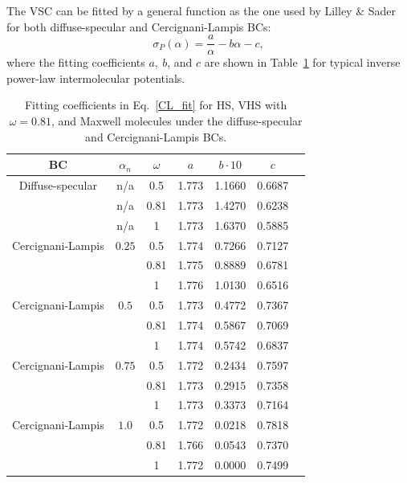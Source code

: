 The VSC can be fitted by a general function as the one used by Lilley \& Sader~\cite{lilley2008velocity} for both diffuse-specular and Cercignani-Lampis BCs:
\begin{equation}\label{CL_fit}
\sigma_P(\alpha)=\frac{a}{\alpha}-b\alpha-c,
\end{equation}
where the fitting coefficients $a,~b$, and $c$ are shown in
Table~\ref{table:slipcoe_fit} for typical inverse power-law intermolecular potentials.



\begin{table}[t]
	\caption{Fitting coefficients in Eq.~\eqref{CL_fit} for HS, VHS with $\omega=0.81$, and Maxwell molecules under the diffuse-specular and Cercignani-Lampis BCs. }
	\label{table:slipcoe_fit}
	\centering
	
	\begin{tabular}{ccccccc}
		\hline
		BC &		$\alpha_n$ & $\omega$
		&  $a$ & $b\cdot 10$  &   $c$   \\
		\hline
		
		Diffuse-specular &	 n/a	& 0.5
		& 1.773  & 1.1660  &  0.6687   \\
		& n/a	& 0.81
		& 1.773  & 1.4270  &  0.6238   \\
		& n/a	& 1
		& 1.773  & 1.6370  &  0.5885   \\
		Cercignani-Lampis &		$0.25$ & 0.5
		& 1.774  & 0.7266  &  0.7127   \\
		&	& 0.81
		& 1.775  & 0.8889  &  0.6781   \\
		&	& 1
		& 1.776  & 1.0130  &  0.6516   \\
		
		Cercignani-Lampis &		$0.5$ & 0.5
		& 1.773  & 0.4772 &  0.7367 \\
		&	& 0.81
		& 1.774  & 0.5867  &  0.7069   \\
		&	& 1
		& 1.774  & 0.5742  &  0.6837  \\
		
		Cercignani-Lampis &		$0.75$ & 0.5
		& 1.772   & 0.2434  &  0.7597   \\
		&	& 0.81
		& 1.773  & 0.2915  &  0.7358  \\
		&	& 1
		& 1.773  & 0.3373  &  0.7164  \\
		Cercignani-Lampis &		$1.0$ &0.5
		& 1.772   &0.0218    & 0.7818 \\
		&	& 0.81
		& 1.766  & 0.0543  &  0.7370   \\
		&	& 1
		& 1.772  & 0.0000  &  0.7499  \\
		\hline
	\end{tabular}\par
	
\end{table}


